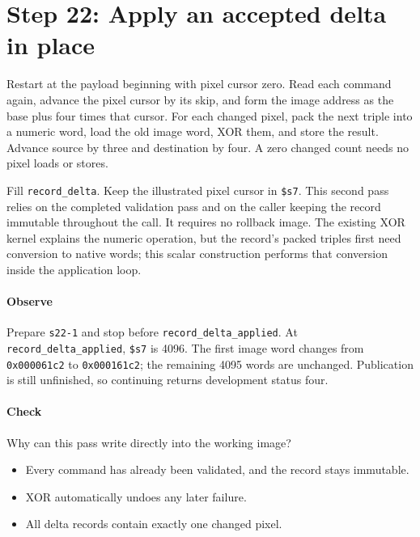 \section{Step 22: Apply an accepted delta in place}
Restart at the payload beginning with pixel cursor zero. Read each command
again, advance the pixel cursor by its skip, and form the image address as the
base plus four times that cursor. For each changed pixel, pack the next triple
into a numeric word, load the old image word, XOR them, and store the result.
Advance source by three and destination by four. A zero changed count needs no
pixel loads or stores.

Fill \texttt{record\_delta}. Keep the illustrated pixel cursor in
\texttt{\$s7}. This second pass relies on the completed validation pass and
on the caller keeping the record immutable throughout the call. It requires no
rollback image. The existing XOR kernel explains the numeric operation, but the
record's packed triples first need conversion to native words; this scalar
construction performs that conversion inside the application loop.

\paragraph{Observe} Prepare \texttt{s22-1} and stop before
\texttt{record\_delta\_applied}. At \texttt{record\_delta\_applied}, \texttt{\$s7} is 4096.
The first image word changes from \texttt{0x000061c2} to
\texttt{0x000161c2}; the remaining 4095 words are unchanged. Publication
is still unfinished, so continuing returns development status four.

\paragraph{Check} Why can this pass write directly into the working image?
\begin{itemize}
  \item[A.] Every command has already been validated, and the record stays immutable.
  \item[B.] XOR automatically undoes any later failure.
  \item[C.] All delta records contain exactly one changed pixel.
\end{itemize}
